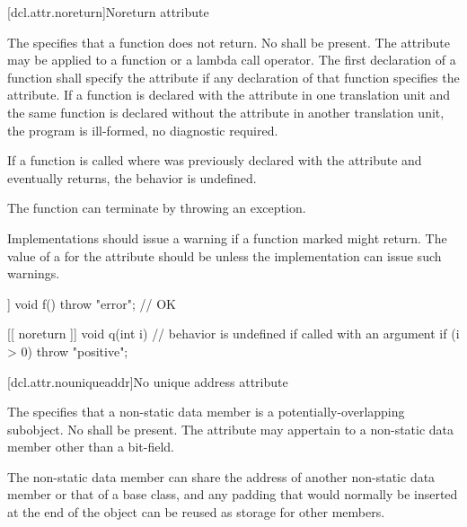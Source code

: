 [dcl.attr.noreturn]{Noreturn attribute}%

\pnum
The   specifies that a function does not return.
No  shall be present.
The attribute may be applied to a function or a lambda call operator.
The first declaration of a function shall
specify the  attribute if any declaration of that function specifies the
 attribute. If a function is declared with the  attribute in one
translation unit and the same function is declared without the  attribute in another
translation unit, the program is ill-formed, no diagnostic required.

\pnum
If a function  is called where  was previously declared with the 
attribute and  eventually returns, the behavior is undefined.
\begin{note}
The function can
terminate by throwing an exception.
\end{note}

\pnum
\recommended
Implementations should issue a
warning if a function marked \tcode{[[noreturn]]} might return.
The value of
a  for the  attribute
should be  unless the implementation can issue such warnings.

\pnum
\begin{example}
\begin{codeblock}
[[ noreturn ]] void f() {
  throw "error";                // OK
}

[[ noreturn ]] void q(int i) {  // behavior is undefined if called with an argument 
  if (i > 0)
    throw "positive";
}
\end{codeblock}
\end{example}

[dcl.attr.nouniqueaddr]{No unique address attribute}%

\pnum
The  
specifies that a non-static data member
is a potentially-overlapping subobject.
No  shall be present.
The attribute may appertain to a non-static data member
other than a bit-field.

\pnum
\begin{note}
The non-static data member can share the address of
another non-static data member or that of a base class,
and any padding that would normally be inserted
at the end of the object
can be reused as storage for other members.
\end{note}

